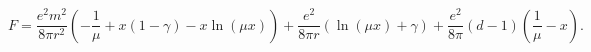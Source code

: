 \begin{equation}
F=\frac{e^{2}m^{2}}{8\pi r^{2}}(-\frac{1}{\mu}+x(1-\gamma)-x\ln(\mu
x))+\frac{e^{2}}{8\pi r}(\ln(\mu x)+\gamma)+\frac{e^{2}}{8\pi}(d-1)(\frac
{1}{\mu}-x).
\end{equation}

